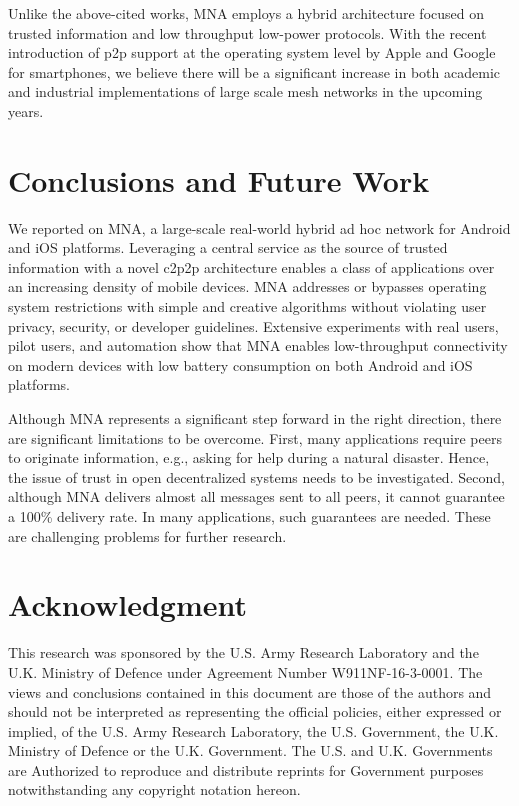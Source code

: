\documentclass[conference]{IEEEtran}
\begin{document}
Unlike the above-cited works, MNA employs a hybrid architecture
focused on trusted information and low throughput low-power
protocols. With the recent introduction of p2p support at the
operating system level by Apple and Google for smartphones, we believe
there will be a significant increase in both academic and industrial
implementations of large scale mesh networks in the upcoming years.
%
\section{Conclusions and Future Work}
\label{sec:conclude}
%
We reported on MNA, a large-scale real-world hybrid ad hoc network for
Android and iOS platforms. Leveraging a central service as the source
of trusted information with a novel c2p2p architecture enables a class
of applications over an increasing density of mobile devices. MNA
addresses or bypasses operating system restrictions with simple and
creative algorithms without violating user privacy, security, or
developer guidelines. Extensive experiments with real users, pilot
users, and automation show that MNA enables low-throughput
connectivity on modern devices with low battery consumption on both
Android and iOS platforms.

Although MNA represents a significant step forward in the right
direction, there are significant limitations to be overcome. First,
many applications require peers to originate information, e.g., asking
for help during a natural disaster. Hence, the issue of trust in open
decentralized systems needs to be investigated.  Second, although MNA
delivers almost all messages sent to all peers, it cannot guarantee a
100\% delivery rate.  In many applications, such guarantees are
needed. These are challenging problems for further research.

%
\section*{Acknowledgment}
This research was sponsored by the U.S. Army Research Laboratory and
the U.K. Ministry of Defence under Agreement Number
W911NF-16-3-0001. The views and conclusions contained in this document
are those of the authors and should not be interpreted as representing
the official policies, either expressed or implied, of the U.S. Army
Research Laboratory, the U.S. Government, the U.K. Ministry of Defence
or the U.K. Government. The U.S. and U.K. Governments are Authorized
to reproduce and distribute reprints for Government purposes
notwithstanding any copyright notation hereon.
 
\end{document}
